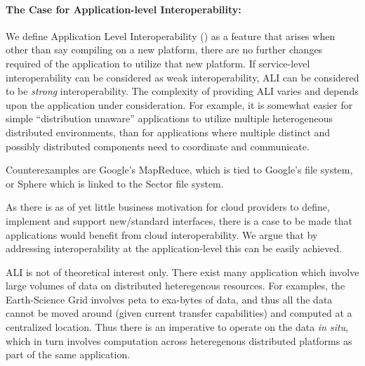 \documentclass[3p,twocolumn]{elsarticle}
\begin{document}
\paragraph{The Case for Application-level Interoperability:}

We define Application Level Interoperability () as a feature
that arises when other than say compiling on a new platform, there are
no further changes required of the application to utilize that new
platform.  If service-level interoperability can be considered as weak
interoperability, ALI can be considered to be {\it strong}
interoperability.  %
The complexity of providing ALI varies and depends upon the
application under consideration.  For example, it is somewhat easier
for simple ``distribution unaware'' applications to utilize multiple
heterogeneous distributed environments, than for applications where
multiple distinct and possibly distributed components need to
coordinate and communicate.  %

 Counterexamples are Google's
MapReduce, which is tied to Google's file system, or
Sphere\cite{sectorsphere09} which is linked to the Sector file system.



As there is as of yet little business motivation for cloud providers
to define, implement and support new/standard interfaces, there is a
case to be made that applications would benefit from cloud
interoperability.  We argue that by addressing interoperability at the
application-level this can be easily achieved.  

ALI is not of theoretical interest only. There exist many application
which involve large volumes of data on distributed heteregenous
resources. For examples, the Earth-Science Grid involves peta to
exa-bytes of data, and thus all the data cannot be moved around (given
current transfer capabilities) and computed at a centralized location.
Thus there is an imperative to operate on the data {\it in situ},
which in turn involves computation across heteregenous distributed
platforms as part of the same application.
 
\end{document}
